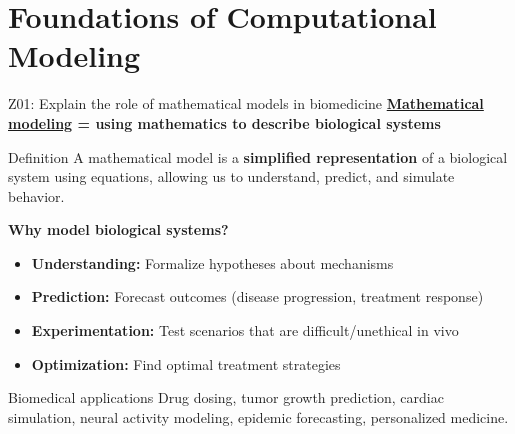 \documentclass[aspectratio=169, 10pt]{beamer}
\begin{document}
\section{Foundations of Computational Modeling}

\begin{frame}{Z01: Explain the role of mathematical models in biomedicine}
    \textbf{\href{https://en.wikipedia.org/wiki/Mathematical_and_theoretical_biology}{Mathematical modeling} = using mathematics to describe biological systems}
    
    \begin{block}{Definition}
        A mathematical model is a \textbf{simplified representation} of a biological system using equations, allowing us to understand, predict, and simulate behavior.
    \end{block}
    
    \vspace{0.2cm}
    \textbf{Why model biological systems?}
    \begin{itemize}
        \item \textbf{Understanding:} Formalize hypotheses about mechanisms
        \item \textbf{Prediction:} Forecast outcomes (disease progression, treatment response)
        \item \textbf{Experimentation:} Test scenarios that are difficult/unethical in vivo
        \item \textbf{Optimization:} Find optimal treatment strategies
    \end{itemize}
    
    \vspace{0.1cm}
    {\small
    \begin{alertblock}{Biomedical applications}
        Drug dosing, tumor growth prediction, cardiac simulation, neural activity modeling, epidemic forecasting, personalized medicine.
    \end{alertblock}
    }
\end{frame}
\end{document}
